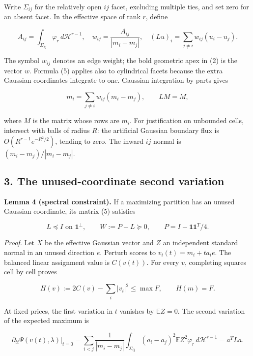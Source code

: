 \documentclass[
  11pt,
]{article}
\begin{document}
Write \(\Sigma_{ij}\) for the relatively open \(ij\) facet, excluding
multiple ties, and set zero for an absent facet. In the effective space
of rank \(r\), define

\[
 A_{ij}=\int_{\Sigma_{ij}}\varphi_r\,d\mathcal H^{r-1},\quad
 w_{ij}=\frac{A_{ij}}{|m_i-m_j|},\quad
 (Lu)_i=\sum_{j\ne i}w_{ij}(u_i-u_j).                     \tag{5}
\]

The symbol \(w_{ij}\) denotes an edge weight; the bold geometric apex in
(2) is the vector \(w\). Formula (5) applies also to cylindrical facets
because the extra Gaussian coordinates integrate to one. Gaussian
integration by parts gives

\[
 m_i=\sum_{j\ne i}w_{ij}(m_i-m_j),\qquad LM=M,             \tag{6}
\]

where \(M\) is the matrix whose rows are \(m_i\). For justification on
unbounded cells, intersect with balls of radius \(R\): the artificial
Gaussian boundary flux is \(O(R^{r-1}e^{-R^2/2})\), tending to zero. The
inward \(ij\) normal is \((m_i-m_j)/|m_i-m_j|\).

\subsection{3. The unused-coordinate second
variation}\label{the-unused-coordinate-second-variation}

\textbf{Lemma 4 (spectral constraint).} If a maximizing partition has an
unused Gaussian coordinate, its matrix (5) satisfies

\[
 L\preceq I\text{ on }\mathbf1^\perp,\qquad
 W:=P-L\succeq0,\qquad P=I-\mathbf1\mathbf1^T/4.           \tag{7}
\]

\emph{Proof.} Let \(X\) be the effective Gaussian vector and \(Z\) an
independent standard normal in an unused direction \(e\). Perturb scores
to \(v_i(t)=m_i+t a_i e\). The balanced linear assignment value is
\(C(v(t))\). For every \(v\), completing squares cell by cell proves

\[
 H(v):=2C(v)-\sum_i|v_i|^2\le\max F,
       \qquad H(m)=F.                                   \tag{8}
\]

At fixed prices, the first variation in \(t\) vanishes by
\(\mathbb EZ=0\). The second variation of the expected maximum is

\[
 \partial_{tt}\Psi(v(t),\lambda)|_{t=0}
   =\sum_{i<j}\frac{1}{|m_i-m_j|}
        \int_{\Sigma_{ij}}(a_i-a_j)^2\mathbb EZ^2
                     \varphi_r\,d\mathcal H^{r-1}
   =a^TLa.                                               \tag{9}
\]
\end{document}
